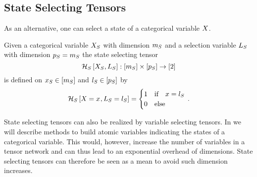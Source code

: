 \subsection{State Selecting Tensors}

As an alternative, one can select a state of a categorical variable $X$.

\begin{definition}
	Given a categorical variable $X_{S}$ with dimension $m_{S}$ and a selection variable $L_{S}$ with dimension $p_{S}=m_{S}$ the state selecting tensor 
		\[ \mathcal{H}_{S}\left[X_{S},L_{S}\right] : [m_{S}] \times [p_{S}] \rightarrow [2] \]
	is defined on $x_{S}\in[m_{S}]$ and $l_{S}\in[p_{S}]$ by
	\begin{align*}
		\mathcal{H}_{S}\left[X_{}=x_{},L_{S}=l_{S}\right] = 
		\begin{cases}
			1 & \text{if} \quad x = l_{S} \\
			0 & \text{else}
		\end{cases} \, . 
	\end{align*}
\end{definition}

State selecting tensors can also be realized by variable selecting tensors.
In  we will describe methods to build atomic variables indicating the states of a categorical variable.
This would, however, increase the number of variables in a tensor network and can thus lead to an exponential overhead of dimensions.
State selecting tensors can therefore be seen as a mean to avoid such dimension increases.










